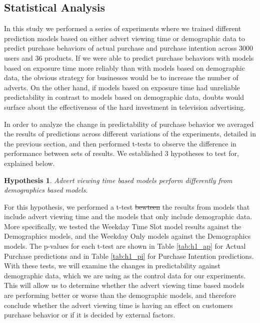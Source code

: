 \documentclass[review]{elsarticle}
\newtheorem{hyp}{Hypothesis}
\providecommand{\DIFaddtex}[1]{{\protect\color{blue}\uwave{#1}}} %
\providecommand{\DIFdeltex}[1]{{\protect\color{red}\sout{#1}}}                      %
\providecommand{\DIFaddbegin}{} %
\providecommand{\DIFaddend}{} %
\providecommand{\DIFdelbegin}{} %
\providecommand{\DIFdelend}{} %
\providecommand{\DIFadd}[1]{\texorpdfstring{\DIFaddtex{#1}}{#1}} %
\providecommand{\DIFdel}[1]{\texorpdfstring{\DIFdeltex{#1}}{}} %
\newcommand{\DIFscaledelfig}{0.5}
\newlength{\DIFdelgraphicswidth} %
\newlength{\DIFdelgraphicsheight} %
\newcommand{\DIFaddincludegraphics}[2][]{{\color{blue}\fbox{\DIFOincludegraphics[#1]{#2}}}} %
\newcommand{\DIFdelincludegraphics}[2][]{%
\sbox{\DIFdelgraphicsbox}{\DIFOincludegraphics[#1]{#2}}%
\settoboxwidth{\DIFdelgraphicswidth}{\DIFdelgraphicsbox} %
\settoboxtotalheight{\DIFdelgraphicsheight}{\DIFdelgraphicsbox} %
\scalebox{\DIFscaledelfig}{%
\parbox[b]{\DIFdelgraphicswidth}{\usebox{\DIFdelgraphicsbox}\\[-\baselineskip] \rule{\DIFdelgraphicswidth}{0em}}\llap{\resizebox{\DIFdelgraphicswidth}{\DIFdelgraphicsheight}{%
\setlength{\unitlength}{\DIFdelgraphicswidth}%
\begin{picture}(1,1)%
\thicklines\linethickness{2pt} %
{\color[rgb]{1,0,0}\put(0,0){\framebox(1,1){}}}%
{\color[rgb]{1,0,0}\put(0,0){\line( 1,1){1}}}%
{\color[rgb]{1,0,0}\put(0,1){\line(1,-1){1}}}%
\end{picture}%
}\hspace*{3pt}}} %
} %
\DeclareRobustCommand{\DIFaddbegin}{\DIFOaddbegin \let\includegraphics\DIFaddincludegraphics} %
\DeclareRobustCommand{\DIFaddend}{\DIFOaddend \let\includegraphics\DIFOincludegraphics} %
\DeclareRobustCommand{\DIFdelbegin}{\DIFOdelbegin \let\includegraphics\DIFdelincludegraphics} %
\DeclareRobustCommand{\DIFdelend}{\DIFOaddend \let\includegraphics\DIFOincludegraphics} %
\begin{document}
\subsection{Statistical Analysis}
\label{h_res}


In this study we performed a series of experiments where we trained different prediction models based on either advert viewing time or demographic data to predict purchase behaviors of actual purchase and purchase intention across 3000 users and 36 products. If we were able to predict purchase behaviors with models based on exposure time more reliably than with models based on demographic data, the obvious strategy for businesses would be to increase the number of adverts. On the other hand, if models based on exposure time had unreliable predictability in contrast to models based on demographic data, doubts would surface about the effectiveness of the hard investment in television advertising. 

In order to analyze the change in predictability of purchase behavior we averaged the results of predictions across different variations of the experiments, detailed in the previous section, and then performed t-tests to observe the difference in performance between sets of results. We established 3 hypotheses to test for, explained below.

\begin{hyp}
\label{hyp:1}
Advert viewing time based models perform differently from demographics based models.
\end{hyp}

For this hypothesis, we performed a t-test \DIFdelbegin \DIFdel{bewteen }\DIFdelend \DIFaddbegin \DIFadd{using }\DIFaddend the results from models that include advert viewing time and the models that only include demographic data. More specifically, we tested the Weekday Time Slot model results against the Demographics models, and the Weekday Only models against the Demographics models. The p-values for each t-test are shown in Table \ref{tab:h1_ap} for Actual Purchase predictions and in Table \ref{tab:h1_pi} for Purchase Intention predictions. With these tests, we will examine the changes in predictability against demographic data, which we are using as the control data for our experiments. This will allow us to determine whether the advert viewing time based models are performing better or worse than the demographic models, and therefore conclude whether the advert viewing time is having an effect on customers purchase behavior or if it is decided by external factors.
\end{document}
